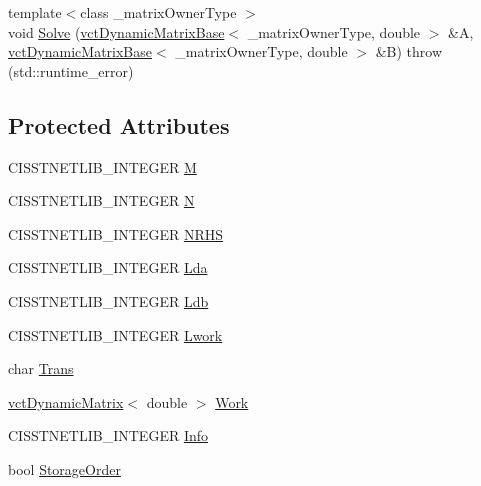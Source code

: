 {\bf }\par
\begin{DoxyCompactItemize}
\item 
{\footnotesize template$<$class \+\_\+matrix\+Owner\+Type $>$ }\\void \hyperlink{classnmr_l_s_solver_acdb3f0210b607660f85804cfce5981b9}{Solve} (\hyperlink{classvct_dynamic_matrix_base}{vct\+Dynamic\+Matrix\+Base}$<$ \+\_\+matrix\+Owner\+Type, double $>$ \&A, \hyperlink{classvct_dynamic_matrix_base}{vct\+Dynamic\+Matrix\+Base}$<$ \+\_\+matrix\+Owner\+Type, double $>$ \&B)  throw (std\+::runtime\+\_\+error)
\end{DoxyCompactItemize}

\subsection*{Protected Attributes}
\begin{DoxyCompactItemize}
\item 
C\+I\+S\+S\+T\+N\+E\+T\+L\+I\+B\+\_\+\+I\+N\+T\+E\+G\+E\+R \hyperlink{classnmr_l_s_solver_a8911bae5a933a6479875c0b3e600ad33}{M}
\item 
C\+I\+S\+S\+T\+N\+E\+T\+L\+I\+B\+\_\+\+I\+N\+T\+E\+G\+E\+R \hyperlink{classnmr_l_s_solver_a06ea8b9ad9abd90f794cdeb74c25b8f8}{N}
\item 
C\+I\+S\+S\+T\+N\+E\+T\+L\+I\+B\+\_\+\+I\+N\+T\+E\+G\+E\+R \hyperlink{classnmr_l_s_solver_a01d9ecf148cd5d9e59906b5e665af2ca}{N\+R\+H\+S}
\item 
C\+I\+S\+S\+T\+N\+E\+T\+L\+I\+B\+\_\+\+I\+N\+T\+E\+G\+E\+R \hyperlink{classnmr_l_s_solver_a91f013fd3848b399838934e9944a8b03}{Lda}
\item 
C\+I\+S\+S\+T\+N\+E\+T\+L\+I\+B\+\_\+\+I\+N\+T\+E\+G\+E\+R \hyperlink{classnmr_l_s_solver_a18e45725c1e373bccc3201e20a483fcb}{Ldb}
\item 
C\+I\+S\+S\+T\+N\+E\+T\+L\+I\+B\+\_\+\+I\+N\+T\+E\+G\+E\+R \hyperlink{classnmr_l_s_solver_a495b9cb5c8c3b62b1d12a0ba6f4e1690}{Lwork}
\item 
char \hyperlink{classnmr_l_s_solver_a55e24be3fab77ab196c264948a7e6616}{Trans}
\item 
\hyperlink{classvct_dynamic_matrix}{vct\+Dynamic\+Matrix}$<$ double $>$ \hyperlink{classnmr_l_s_solver_a4b87766126014f24e3a2dbc2c3ab3d31}{Work}
\item 
C\+I\+S\+S\+T\+N\+E\+T\+L\+I\+B\+\_\+\+I\+N\+T\+E\+G\+E\+R \hyperlink{classnmr_l_s_solver_a6d0d69c4ff841404a6be897dc17f41aa}{Info}
\item 
bool \hyperlink{classnmr_l_s_solver_a86082a8fc8b55dee2d677af9222fc7e6}{Storage\+Order}
\end{DoxyCompactItemize}



